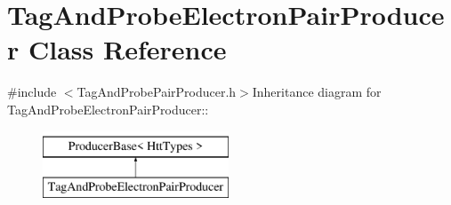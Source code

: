 \hypertarget{classTagAndProbeElectronPairProducer}{
\section{TagAndProbeElectronPairProducer Class Reference}
\label{classTagAndProbeElectronPairProducer}
}


{\ttfamily \#include $<$TagAndProbePairProducer.h$>$}Inheritance diagram for TagAndProbeElectronPairProducer::\begin{figure}[H]
\begin{center}
\leavevmode
\includegraphics[height=2cm]{classTagAndProbeElectronPairProducer}
\end{center}
\end{figure}
